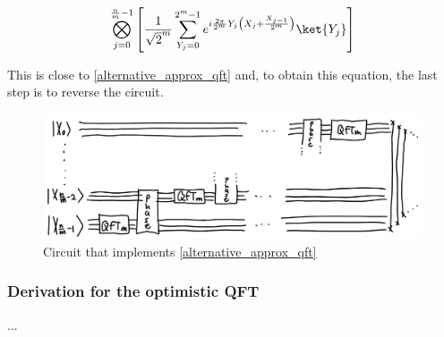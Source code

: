 \begin{equation*}
    \bigotimes_{j=0}^{\frac{n}{m}-1}\left[\frac{1}{\sqrt{2}^m}\sum_{Y_{j}=0}^{2^m-1}e^{i\frac{2\pi}{2^m}Y_{j}\left(X_{j} + \frac{X_{j-1}}{2^m}\right)}\ket{Y_{j}}\right]
\end{equation*}

This is close to \ref{alternative_approx_qft} and, to obtain this equation, the last step is to reverse the circuit.

\begin{figure}[H]
    \centering
    \includegraphics*[scale=0.18]{images/approx_circuit.jpg}
    \caption{Circuit that implements \ref{alternative_approx_qft}}
    \label{approx_circuit}
\end{figure}

\subsubsection{Derivation for the optimistic QFT}
...




















